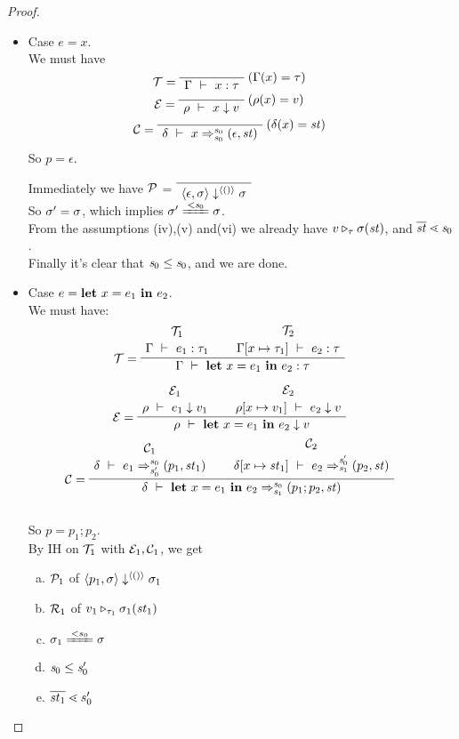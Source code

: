 \begin{proof}
\begin{itemize}
\begin{enumerate}[(i)]
	\end{enumerate}

 \item Case $e = x$.\\
 We must have 
 $$\MT = \PT{
 	\AxiomC{}
 	\RiLa{(\Gam(x) = \tau)}
 	\UC{\Type{\Gam}{x}{\tau}}
 }$$
 $$ \ME = 
 \PT{
 	\AxiomC{}
 	\RiLa{(\rho(x)=v)}
 	\UC{\Eval{\rho}{x}{v}}
 }$$
 $$ \MC = 
 \PT{\AC{}
 	\RiLa{(\del(x)= \st)}
 	\UC{\Trans{\del}{x}{\s_0}{\s_0}{\sfun{\epsilon}{\st}}}
 }
 $$
 So $p= \epsilon$. 
 
 Immediately we have $\mathcal{P}$ =
 $\PT{\Axiom{\seval{\epsilon}{\sgm}{\vunit}{\sgm}}}$\\
 So $\sigma' = \sigma$, which implies $\sgm'  \ConEq{\s_0} \sgm$.\\
 From the assumptions (iv),(v) and(vi) we already have $v \triangleright_{\tau} \sigma(\mathit{st})$,
 and $\ol{\st} \.< \s_0$. \\
 Finally it's clear that $\mathit{s}_0 \le \mathit{s}_0$, and we are done.
 
 
 \item \label{case-let} Case $e = \mathbf{let} \ x = e_1 \ \mathbf{in} \ e_2$. \\[1ex]
 We must have:
 $$\PT{
 	\UCN{\MT_1}{\Type{\Gam}{e_1}{\tau_1}}
 	\UCN{\MT_2}{\Type{\Gam[\Map{x}{\tau_1}]}{e_2}{\tau}}
 	\LeLa{\MT =} 
 	\BC{\Type{\Gam}{\Let{x}{e_1}{e_2}}{\tau}}
 }$$
 
 $$\PT{	
 	\UCN{\ME_1}{\Eval{\rho}{e_1}{v_1}}
 	\UCN{\ME_2}{\Eval{\rho[\Map{x}{v_1}]}{e_2}{v}}
 	\LeLa{\ME =} 
 	\BC{\Eval{\rho}{\Let{x}{e_1}{e_2}}{v}}
 }$$ 
 $$\PT{\UCN{\MC_1}{\Trans{\del}{e_1}{\s_0}{\s_0'}{\sfun{p_1}{\st_1}}}
 	\UCN{\MC_2}{\Trans{\del[x \|-> {\st_1}]}{e_2}{\s_0'}{\s_1}{\sfun {p_2} {\st}}}
 	\LeLa{\MC = }
 	\BC{\Trans{\del}{\Let{x}{e_1}{e_2}}{\s_0}{\s_1}{\sfun {p_1;p_2} {\st}}}
 }$$\\[1ex]
 
 So $p = p_1;p_2$. \\
 
 By IH on $\mathcal{T}_1$ with $\mathcal{E}_1,\mathcal{C}_1$, we get 
 \begin{enumerate}[(a)]
 	\item $\mathcal{P}_1$ of $\left\langle p_1,\sigma \right\rangle \downarrow^{\langle () \rangle} \sigma_1$
 	\item $\mathcal{R}_1$ of $v_1 \triangleright_{\tau_1} \sigma_1(\mathit{st}_1)$
 	\item $\sgm_1 \ConEq{s_0} \sgm$ 
 	\item $\mathit{s}_0 \le \mathit{s}_0'$
 	\item $\ol{\st_1} \.< {s_0'}$
 \end{enumerate}
 

\end{itemize}
\end{proof}
